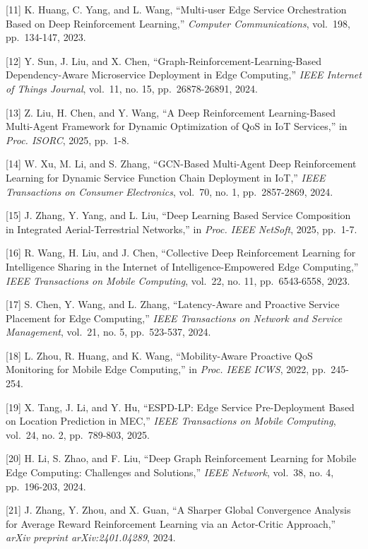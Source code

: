 {[}11{]} K. Huang, C. Yang, and L. Wang, ``Multi-user Edge Service
Orchestration Based on Deep Reinforcement Learning,'' \emph{Computer
	Communications}, vol.~198, pp.~134-147, 2023.

{[}12{]} Y. Sun, J. Liu, and X. Chen,
``Graph-Reinforcement-Learning-Based Dependency-Aware Microservice
Deployment in Edge Computing,'' \emph{IEEE Internet of Things Journal},
vol.~11, no. 15, pp.~26878-26891, 2024.

{[}13{]} Z. Liu, H. Chen, and Y. Wang, ``A Deep Reinforcement
Learning-Based Multi-Agent Framework for Dynamic Optimization of QoS in
IoT Services,'' in \emph{Proc. ISORC}, 2025, pp.~1-8.

{[}14{]} W. Xu, M. Li, and S. Zhang, ``GCN-Based Multi-Agent Deep
Reinforcement Learning for Dynamic Service Function Chain Deployment in
IoT,'' \emph{IEEE Transactions on Consumer Electronics}, vol.~70, no. 1,
pp.~2857-2869, 2024.

{[}15{]} J. Zhang, Y. Yang, and L. Liu, ``Deep Learning Based Service
Composition in Integrated Aerial-Terrestrial Networks,'' in \emph{Proc.
	IEEE NetSoft}, 2025, pp.~1-7.

{[}16{]} R. Wang, H. Liu, and J. Chen, ``Collective Deep Reinforcement
Learning for Intelligence Sharing in the Internet of
Intelligence-Empowered Edge Computing,'' \emph{IEEE Transactions on
	Mobile Computing}, vol.~22, no. 11, pp.~6543-6558, 2023.

{[}17{]} S. Chen, Y. Wang, and L. Zhang, ``Latency-Aware and Proactive
Service Placement for Edge Computing,'' \emph{IEEE Transactions on
	Network and Service Management}, vol.~21, no. 5, pp.~523-537, 2024.

{[}18{]} L. Zhou, R. Huang, and K. Wang, ``Mobility-Aware Proactive QoS
Monitoring for Mobile Edge Computing,'' in \emph{Proc. IEEE ICWS}, 2022,
pp.~245-254.

{[}19{]} X. Tang, J. Li, and Y. Hu, ``ESPD-LP: Edge Service
Pre-Deployment Based on Location Prediction in MEC,'' \emph{IEEE
	Transactions on Mobile Computing}, vol.~24, no. 2, pp.~789-803, 2025.

{[}20{]} H. Li, S. Zhao, and F. Liu, ``Deep Graph Reinforcement Learning
for Mobile Edge Computing: Challenges and Solutions,'' \emph{IEEE
	Network}, vol.~38, no. 4, pp.~196-203, 2024.

{[}21{]} J. Zhang, Y. Zhou, and X. Guan, ``A Sharper Global Convergence
Analysis for Average Reward Reinforcement Learning via an Actor-Critic
Approach,'' \emph{arXiv preprint arXiv:2401.04289}, 2024.


